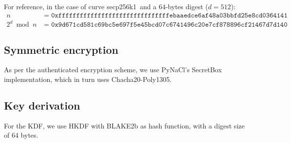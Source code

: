 \documentclass{amsart}
\newcommand{\secp}{\textsf{secp256k1}}
\begin{document}
For reference, in the case of curve \secp~and a 64-bytes digest ($d=512$):
\begin{align*} 
n &= \mathtt{0xfffffffffffffffffffffffffffffffebaaedce6af48a03bbfd25e8cd0364141} \\ 
2^d \bmod n &= \mathtt{0x9d671cd581c69bc5e697f5e45bcd07c6741496c20e7cf878896cf21467d7d140}
\end{align*}

\subsection{Symmetric encryption}
As per the authenticated encryption scheme, we use PyNaCl's SecretBox implementation, which in turn uses Chacha20-Poly1305.

\subsection{Key derivation}
For the KDF, we use \textsf{HKDF} with \textsf{BLAKE2b} as hash function, with a digest size of 64 bytes. 




\end{document}
